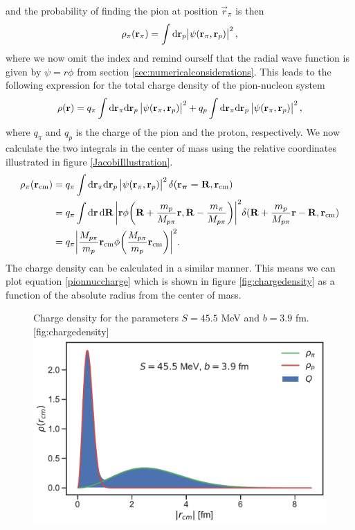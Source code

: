 and the probability of finding the pion at position $\vec{r}_\pi$ is then
\begin{equation}\label{posirpi}
	\rho_\pi(\bm{\mathrm{r}}_\pi) = \int \text{d}\bm{\mathrm{r}}_p \abs{\psi(\bm{\mathrm{r}}_\pi,\bm{\mathrm{r}}_p)}^2,
\end{equation}
where we now omit the index and remind ourself that the radial wave function is given by $\psi=r\phi$ from section \ref{sec:numericalconsiderations}. This leads to the following expression for the total charge density of the pion-nucleon system
\begin{equation}\label{pionnuccharge}
	\rho(\bm{\mathrm{r}}) = q_\pi \int \text{d}\bm{\mathrm{r}}_\pi \text{d}\bm{\mathrm{r}}_p \, \abs{\psi(\bm{\mathrm{r}}_\pi,\bm{\mathrm{r}}_p)}^2+q_p \int \text{d}\bm{\mathrm{r}}_\pi \text{d}\bm{\mathrm{r}}_p \, \abs{\psi(\bm{\mathrm{r}}_\pi,\bm{\mathrm{r}}_p)}^2,
\end{equation}
where $q_\pi$ and $q_p$ is the charge of the pion and the proton, respectively. We now calculate the two integrals in the center of mass using the relative coordinates illustrated in figure \ref{JacobiIllustration}.
\begin{align}
		\rho_\pi(\bm{\mathrm{r}}_\text{cm}) &= q_\pi \int \text{d}\bm{\mathrm{r}}_\pi \text{d} \bm{\mathrm{r}}_p \, \abs{\psi(\bm{\mathrm{r}}_\pi,\bm{\mathrm{r}}_p)}^2 \delta(\bm{\mathrm{r_\pi-\bm{\mathrm{R}}}},\bm{\mathrm{r}}_\text{cm}) \\
		&= q_\pi \int \text{d}\bm{\mathrm{r}} \,\text{d}\bm{\mathrm{R}} \, \bigg\lvert\bm{\mathrm{r}}\phi\bigg(\bm{\mathrm{R}}+\frac{m_p}{M_{p\pi}}\bm{\mathrm{r}},\bm{\mathrm{R}}-\frac{m_\pi}{M_{p\pi}}\bigg)\bigg\rvert^2 \delta(\bm{\mathrm{R}}+\frac{m_p}{M_{p\pi}}\bm{\mathrm{r}}-\bm{\mathrm{R}},\bm{\mathrm{r}}_\text{cm}) \\
			&= q_\pi \bigg \lvert\frac{M_{p\pi}}{m_p}\bm{\mathrm{r}}_\text{cm}\phi\bigg(\frac{M_{p\pi}}{m_p}\bm{\mathrm{r}}_{\text{cm}}\bigg) \bigg\rvert^2.
\end{align}
The charge density can be calculated in a similar manner. This means we can plot equation \eqref{pionnuccharge} which is shown in figure \ref{fig:chargedensity} as a function of the absolute radius from the center of mass.
\begin{figure}[H]
	\begin{sidecaption}{Charge density for the parameters $S=45.5$ MeV and $b=3.9$ fm.}[fig:chargedensity]
		\includegraphics[width=\linewidth]{Figures/ChargeDensity.pdf} 
	\end{sidecaption}
\end{figure}
